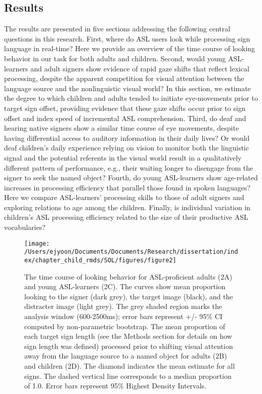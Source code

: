 \documentclass[oneside]{report}
\begin{document}
\subsection{Results}\label{results}

The results are presented in five sections addressing the following
central questions in this research. First, where do ASL users look while
processing sign language in real-time? Here we provide an overview of
the time course of looking behavior in our task for both adults and
children. Second, would young ASL-learners and adult signers show
evidence of rapid gaze shifts that reflect lexical processing, despite
the apparent competition for visual attention between the language
source and the nonlinguistic visual world? In this section, we estimate
the degree to which children and adults tended to initiate eye-movements
prior to target sign offset, providing evidence that these gaze shifts
occur prior to sign offset and index speed of incremental ASL
comprehension. Third, do deaf and hearing native signers show a similar
time course of eye movements, despite having differential access to
auditory information in their daily lives? Or would deaf children's
daily experience relying on vision to monitor both the linguistic signal
and the potential referents in the visual world result in a
qualitatively different pattern of performance, e.g., their waiting
longer to disengage from the signer to seek the named object? Fourth, do
young ASL-learners show age-related increases in processing efficiency
that parallel those found in spoken languages? Here we compare
ASL-learners' processing skills to those of adult signers and exploring
relations to age among the children. Finally, is individual variation in
children's ASL processing efficiency related to the size of their
productive ASL vocabularies?
\begin{figure}[!t]

{\centering \texttt{[image: /Users/ejyoon/Documents/Documents/Research/dissertation/index/chapter\_child\_rmds/SOL/figures/figure2]} 

}

\caption[Time course looking behavior for ASL-proficient adults and young ASL-learners]{The time course of looking behavior for ASL-proficient adults (2A) and young ASL-learners (2C). The curves show mean proportion looking to the signer (dark grey), the target image (black), and the distracter image (light grey). The grey shaded region marks the analysis window (600-2500ms); error bars represent +/- 95\% CI computed by non-parametric bootstrap. The mean proportion of each target sign length (see the Methods section for details on how sign length was defined) processed prior to shifting visual attention away from the language source to a named object for adults (2B) and children (2D). The diamond indicates the mean estimate for all signs. The dashed vertical line corresponds to a median proportion of 1.0. Error bars represent 95\% Highest Density Intervals.}\label{fig:sol-tc-figure}
\end{figure}
\end{document}
